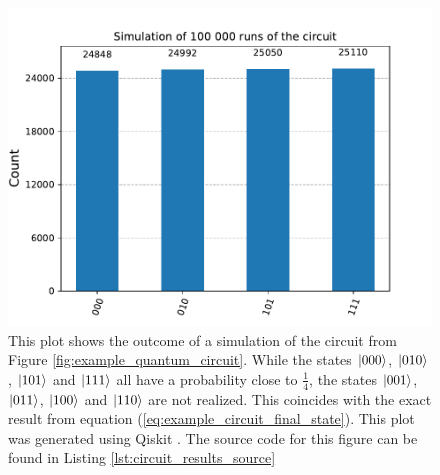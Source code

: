 	\begin{figure}[H]
		\centering
		\includegraphics[width=0.7\linewidth]{figures/qc_results.pdf}
		\caption{This plot shows the outcome of a simulation of the circuit from Figure \ref{fig:example_quantum_circuit}. While the states $\ket{000}$, $\ket{010}$, $\ket{101}$ and $\ket{111}$ all have a probability close to $\frac{1}{4}$, the states $\ket{001}$, $\ket{011}$, $\ket{100}$ and $\ket{110}$ are not realized. This coincides with the exact result from equation (\ref{eq:example_circuit_final_state}). This plot was generated using Qiskit \cite{qiskit2024}. The source code for this figure can be found in Listing \ref{lst:circuit_results_source}}
		\label{fig:example_circuit_results}
	\end{figure}

